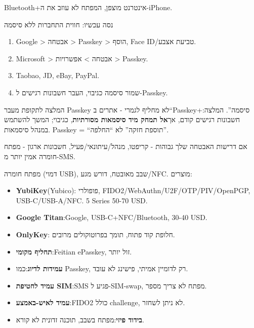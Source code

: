 Bluetooth+אינטרנט מוצפן, המפתח לא עוזב את ה-iPhone.

\begin{tcbpractice}{נסה עכשיו: חווית התחברות ללא סיסמה}
\begin{enumerate}
  \item Google > אבטחה > Passkey > הוסף, Face ID/טביעת אצבע.
  \item Microsoft > אבטחה > אפשרויות > Passkey.
  \item Taobao, JD, eBay, PayPal.
  \item שמור סיסמה כגיבוי, העבר חשבונות רגישים ל-Passkey.
\end{enumerate}

\end{tcbpractice}

\begin{tcbwarn}{המלצה לתקופת מעבר}
Passkey לא מחליף לגמרי - אתרים ב“Passkey+סיסמה”. המלצה: חשבונות רגישים קודם, אך\textbf{אל תמחק מיד סיסמאות מסורתיות}, כגיבוי; המשך להשתמש במנהל סיסמאות. Passkey = “תוספת חזקה” לא “החלפה”.

\end{tcbwarn}


אם דרישות האבטחה שלך גבוהות - קריפטו, מנהל/עיתונאי/פעיל, חשבונות ארגון - מפתח חומרה אמין יותר מ-SMS.


מפתח חומרה (דמוי USB), שבב מאובטח, דורש מגע/NFC. מוצרים:

\begin{itemize}
  \item \textbf{YubiKey}(Yubico): פופולרי, FIDO2/WebAuthn/U2F/OTP/PIV/OpenPGP, USB-C/USB-A/NFC. 5 Series 50-70 USD.
  \item \textbf{Google Titan}:Google, USB-C+NFC/Bluetooth, 30-40 USD.
  \item \textbf{OnlyKey}: חלופת קוד פתוח, תומך בפרוטוקולים מרובים.
  \item \textbf{תחליף מקומי}:Feitian ePasskey, זול יותר.
\end{itemize}


\begin{itemize}
  \item \textbf{עמידות לדיוג}:כמו Passkey, רק לדומיין אמיתי, פישינג לא עובד.
  \item \textbf{עמיד לחטיפת SIM}:SMS פגיע ל-SIM-swap, מפתח לא צריך מספר.
  \item \textbf{עמיד לאיש-באמצע}:FIDO2 כולל challenge, לא ניתן לשחזר.
  \item \textbf{בידוד פיזי}:מפתח בשבב, תוכנה זדונית לא קורא.
\end{itemize}

